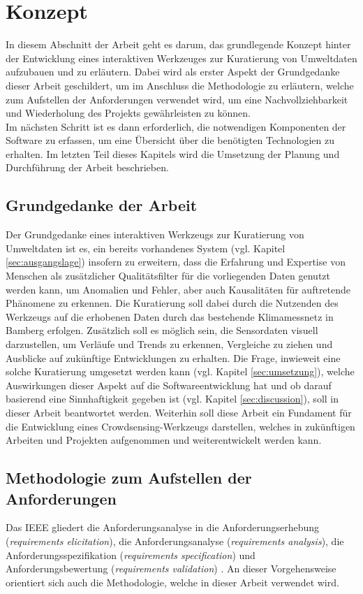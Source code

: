 \chapter{Konzept} %
In diesem Abschnitt der Arbeit geht es darum, das grundlegende Konzept hinter der Entwicklung eines interaktiven Werkzeuges zur Kuratierung von Umweltdaten aufzubauen und zu erläutern. Dabei wird als erster Aspekt der Grundgedanke dieser Arbeit geschildert, um im Anschluss die Methodologie zu erläutern, welche zum Aufstellen der Anforderungen verwendet wird, um eine Nachvollziehbarkeit und Wiederholung des Projekts gewährleisten zu können. \\ Im nächsten Schritt ist es dann erforderlich, die notwendigen Komponenten der Software zu erfassen, um eine Übersicht über die benötigten Technologien zu erhalten. Im letzten Teil dieses Kapitels wird die Umsetzung der Planung und Durchführung der Arbeit beschrieben.

\section{Grundgedanke der Arbeit}
Der Grundgedanke eines interaktiven Werkzeugs zur Kuratierung von Umweltdaten ist es, ein bereits vorhandenes System (vgl. Kapitel \ref{sec:ausgangslage}) insofern zu erweitern, dass die Erfahrung und Expertise von Menschen als zusätzlicher Qualitätsfilter für die vorliegenden Daten genutzt werden kann, um Anomalien und Fehler, aber auch Kausalitäten für auftretende Phänomene zu erkennen. Die Kuratierung soll dabei durch die Nutzenden des Werkzeugs auf die erhobenen Daten durch das bestehende Klimamessnetz in Bamberg erfolgen. Zusätzlich soll es möglich sein, die Sensordaten visuell darzustellen, um Verläufe und Trends zu erkennen, Vergleiche zu ziehen und Ausblicke auf zukünftige Entwicklungen zu erhalten. Die Frage, inwieweit eine solche Kuratierung umgesetzt werden kann (vgl. Kapitel \ref{sec:umsetzung}), welche Auswirkungen dieser Aspekt auf die Softwareentwicklung hat und ob darauf basierend eine Sinnhaftigkeit gegeben ist (vgl. Kapitel \ref{sec:discussion}), soll in dieser Arbeit beantwortet werden. Weiterhin soll diese Arbeit ein Fundament für die Entwicklung eines Crowdsensing-Werkzeugs darstellen, welches in zukünftigen Arbeiten und Projekten aufgenommen und weiterentwickelt werden kann. 

\section{Methodologie zum Aufstellen der Anforderungen}
\label{sec:methodologyrequirements}
Das \ac{IEEE} gliedert die Anforderungsanalyse in die Anforderungserhebung (\textit{requirements elicitation}), die Anforderungsanalyse (\textit{requirements analysis}), die Anforderungsspezifikation (\textit{requirements specification}) und Anforderungsbewertung (\textit{requirements validation}) \cite{ieee2004}. An dieser Vorgehensweise orientiert sich auch die Methodologie, welche in dieser Arbeit verwendet wird.

